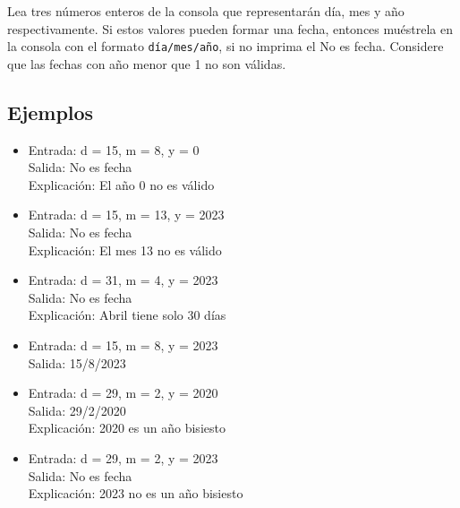 Lea tres números enteros de la consola que representarán día, mes y año respectivamente. Si estos valores pueden formar una fecha, entonces muéstrela en la consola con el formato \texttt{día/mes/año}, si no imprima el No es fecha. Considere que las fechas con año menor que 1 no son válidas.

\subsection*{Ejemplos}
\begin{itemize}
    \item Entrada: d = 15, m = 8, y = 0\\
    Salida: No es fecha\\
    Explicación: El año 0 no es válido

    \item Entrada: d = 15, m = 13, y = 2023\\
    Salida: No es fecha\\
    Explicación: El mes 13 no es válido
    
    \item Entrada: d = 31, m = 4, y = 2023\\
    Salida: No es fecha\\
    Explicación: Abril tiene solo 30 días

    \item Entrada: d = 15, m = 8, y = 2023\\
    Salida: 15/8/2023
    
    \item Entrada: d = 29, m = 2, y = 2020\\
    Salida: 29/2/2020\\
    Explicación: 2020 es un año bisiesto

    \item Entrada: d = 29, m = 2, y = 2023\\
    Salida: No es fecha\\
    Explicación: 2023 no es un año bisiesto
    
\end{itemize}